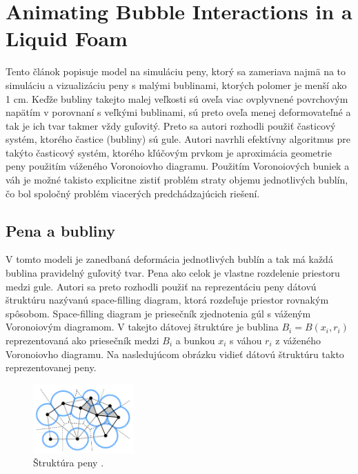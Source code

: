\section{Animating Bubble Interactions in a Liquid Foam \cite{busaryev2012}}

Tento článok popisuje model na simuláciu peny, ktorý sa zameriava najmä na to simuláciu a vizualizáciu peny s malými bublinami, ktorých polomer je menší ako 1 cm. Keďže bubliny takejto malej veľkosti sú oveľa viac ovplyvnené povrchovým napätím v porovnaní s veľkými bublinami, sú preto oveľa menej deformovateľné a tak je ich tvar takmer vždy guľovitý. Preto sa autori rozhodli použiť časticový systém, ktorého častice (bubliny) sú gule. Autori navrhli efektívny algoritmus pre takýto časticový systém, ktorého kľúčovým prvkom je aproximácia geometrie peny použitím váženého Voronoiovho diagramu. Použitím Voronoiových buniek a váh je možné takisto explicitne zistiť problém straty objemu jednotlivých bublín, čo bol spoločný problém viacerých predchádzajúcich riešení.

\subsection{Pena a bubliny}

V tomto modeli je zanedbaná deformácia jednotlivých bublín a tak má každá bublina pravidelný guľovitý tvar. Pena ako celok je vlastne rozdelenie priestoru medzi gule. Autori sa preto rozhodli použiť na reprezentáciu peny dátovú štruktúru nazývanú space-filling diagram, ktorá rozdeľuje priestor rovnakým spôsobom. Space-filling diagram je priesečník zjednotenia gúl s váženým Voronoiovým diagramom. V takejto dátovej štruktúre je bublina $B_{i} = B(x_{i}, r_{i})$ reprezentovaná ako priesečník medzi $B_{i}$ a bunkou $x_{i}$ s váhou $r_{i}$ z váženého Voronoiovho diagramu. Na nasledujúcom obrázku vidieť dátovú štruktúru takto reprezentovanej peny.
\begin{figure}[H]
	\begin{center}
		\includegraphics[height=100px]{images/busaryev/foam_voronoi_space_filling}
		\caption{Štruktúra peny \cite{busaryev2012}.}
	\end{center}
\end{figure}

